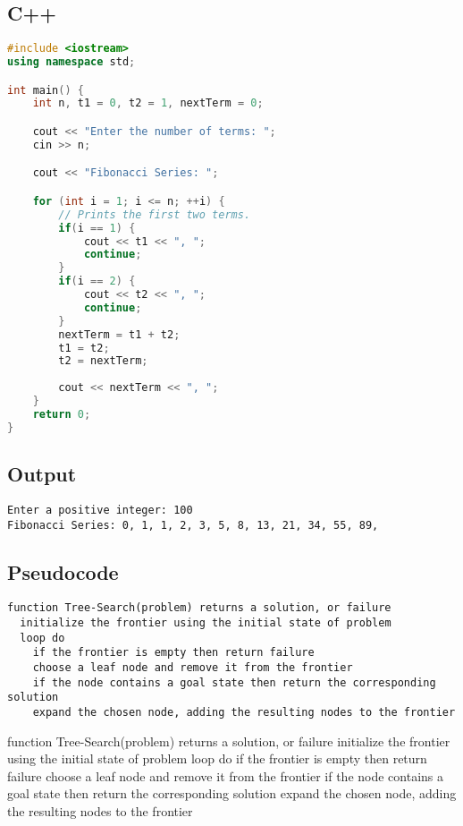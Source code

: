 \documentclass[10pt,titlepage]{article}
\begin{document}
\subsection{C++}

\begin{lstlisting}[language=c++]
#include <iostream>
using namespace std;

int main() {
    int n, t1 = 0, t2 = 1, nextTerm = 0;

    cout << "Enter the number of terms: ";
    cin >> n;

    cout << "Fibonacci Series: ";

    for (int i = 1; i <= n; ++i) {
        // Prints the first two terms.
        if(i == 1) {
            cout << t1 << ", ";
            continue;
        }
        if(i == 2) {
            cout << t2 << ", ";
            continue;
        }
        nextTerm = t1 + t2;
        t1 = t2;
        t2 = nextTerm;
        
        cout << nextTerm << ", ";
    }
    return 0;
}
\end{lstlisting}

\subsection{Output}

\begin{lstlisting}[style=lstoutput]
Enter a positive integer: 100
Fibonacci Series: 0, 1, 1, 2, 3, 5, 8, 13, 21, 34, 55, 89, 
\end{lstlisting}

\subsection{Pseudocode}

\begin{lstlisting}[language=pseudo]
function Tree-Search(problem) returns a solution, or failure
  initialize the frontier using the initial state of problem
  loop do
    if the frontier is empty then return failure
    choose a leaf node and remove it from the frontier
    if the node contains a goal state then return the corresponding solution
    expand the chosen node, adding the resulting nodes to the frontier
\end{lstlisting}

\begin{code}[pseudo]
  function Tree-Search(problem) returns a solution, or failure
  initialize the frontier using the initial state of problem
  loop do
    if the frontier is empty then return failure
    choose a leaf node and remove it from the frontier
    if the node contains a goal state then return the corresponding solution
    expand the chosen node, adding the resulting nodes to the frontier
\end{code}
\end{document}

